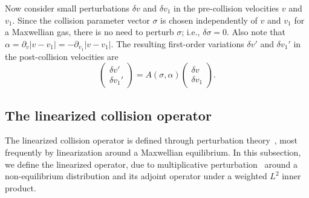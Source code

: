 \documentclass[times,final,nopreprintline]{elsarticle}
\begin{document}
Now consider small perturbations $\delta v$ and $\delta v_1$ in the pre-collision velocities $v$ and $v_1$. Since the collision parameter vector $\sigma$ is chosen independently of $v$ and $v_1$ for a Maxwellian gas, there is no need to perturb $\sigma$; i.e., $\delta\sigma = 0$.  Also note that
$\alpha = \partial_v |v - v_1|  = - \partial_{v_1} |v - v_1| $. 
The resulting first-order variations $\delta v'$ and $\delta v_1'$ in the post-collision velocities are  
\begin{equation}\label{eq:fwd_perturb_General}
        \begin{pmatrix}
    \delta v'\\
    \delta v_1'
    \end{pmatrix}   =
    A(\sigma,\alpha)    
 \begin{pmatrix}
    \delta  v\\
    \delta v_1
    \end{pmatrix}.
\end{equation}




\subsection{The linearized collision operator}%
The linearized collision operator is defined through perturbation theory~\cite{cercignani1969mathematical}, most frequently by linearization around a Maxwellian equilibrium. In this subsection, we define the linearized operator, due to multiplicative perturbation~\cite{arkeryd1988stability,caflisch1980boltzmann} around a non-equilibrium distribution and its adjoint operator under a weighted $L^2$ inner product. 
\end{document}
